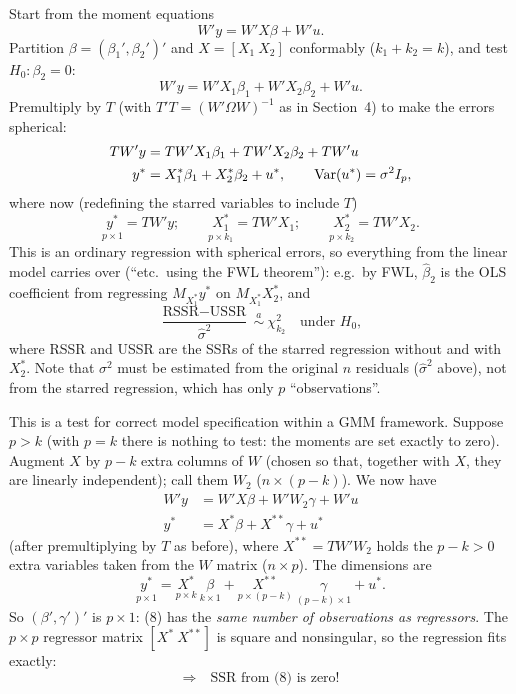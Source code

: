 \documentclass[11pt]{article}
\begin{document}
Start from the moment equations
\begin{equation}\tag{7}
 W'y=W'X\beta+W'u .
\end{equation}
Partition $\beta=(\beta_{1}',\beta_{2}')'$ and $X=[X_{1}\ X_{2}]$ conformably ($k_{1}+k_{2}=k$), and test
$H_{0}\colon\beta_{2}=0$:
\[ W'y=W'X_{1}\beta_{1}+W'X_{2}\beta_{2}+W'u . \]
Premultiply by $T$ (with $T'T=(W'\Omega W)^{-1}$ as in Section~4) to make the errors spherical:
\begin{align*}
 TW'y&=TW'X_{1}\beta_{1}+TW'X_{2}\beta_{2}+TW'u\\
 y^{*}&=X_{1}^{*}\beta_{1}+X_{2}^{*}\beta_{2}+u^{*},\qquad \operatorname{Var}(u^{*})=\sigma^{2}I_{p},
\end{align*}
where now (redefining the starred variables to include $T$)
\[ \underset{p\times1}{y^{*}}=TW'y ;\qquad \underset{p\times k_{1}}{X_{1}^{*}}=TW'X_{1} ;\qquad \underset{p\times k_{2}}{X_{2}^{*}}=TW'X_{2} . \]
This is an ordinary regression with spherical errors, so everything from the linear model carries over
(``etc.\ using the FWL theorem''): e.g.\ by FWL, $\hat\beta_{2}$ is the OLS coefficient from regressing
$M_{X_{1}^{*}}y^{*}$ on $M_{X_{1}^{*}}X_{2}^{*}$, and
\[ \frac{\text{RSSR}-\text{USSR}}{\hat\sigma^{2}}\ \overset{a}{\sim}\ \chi^{2}_{k_{2}}\quad\text{under }H_{0}, \]
where RSSR and USSR are the SSRs of the starred regression without and with $X_{2}^{*}$. Note that
$\sigma^{2}$ must be estimated from the original $n$ residuals ($\hat\sigma^{2}$ above), not from the starred regression,
which has only $p$ ``observations''.

This is a test for correct model specification within a GMM framework. Suppose $p>k$ (with $p=k$ there is
nothing to test: the moments are set exactly to zero). Augment $X$ by $p-k$ extra columns of $W$
(chosen so that, together with $X$, they are linearly independent); call them $W_{2}$ ($n\times(p-k)$).
We now have
\begin{equation}\tag{8}
\begin{aligned}
 W'y&=W'X\beta+W'W_{2}\gamma+W'u\\
 y^{*}&=X^{*}\beta+X^{**}\gamma+u^{*}
\end{aligned}
\end{equation}
(after premultiplying by $T$ as before), where $X^{**}=TW'W_{2}$ holds the $p-k>0$ extra variables taken
from the $W$ matrix ($n\times p$). The dimensions are
\[ \underset{p\times1}{y^{*}}=\underset{p\times k}{X^{*}}\ \underset{k\times1}{\beta}
   +\underset{p\times(p-k)}{X^{**}}\ \underset{(p-k)\times1}{\gamma}+u^{*} . \]
So $(\beta',\gamma')'$ is $p\times1$: (8) has the \emph{same number of observations as regressors}. The
$p\times p$ regressor matrix $[X^{*}\ X^{**}]$ is square and nonsingular, so the regression fits exactly:
\[ \Longrightarrow\quad \text{SSR from (8) is zero!} \]
\end{document}
